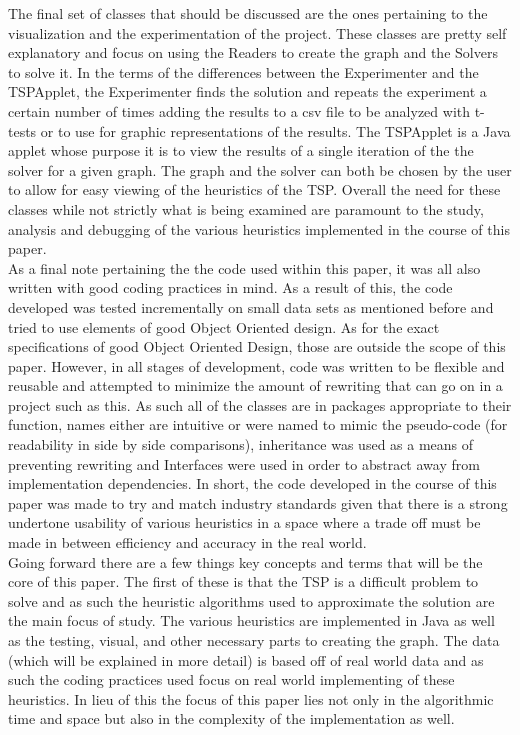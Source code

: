 \documentclass[midd]{thesis}
\newcommand{\tab}{\hspace*{2em}}
\begin{document}
\tab The final set of classes that should be discussed are the ones pertaining to the visualization and the experimentation of the project. These classes are pretty self explanatory and focus on using the Readers to create the graph and the Solvers to solve it. In the terms of the differences between the Experimenter and the TSPApplet, the Experimenter finds the solution and repeats the experiment a certain number of times adding the results to a csv file to be analyzed with t-tests or to use for graphic representations of the results. The TSPApplet is a Java applet whose purpose it is to view the results of a single iteration of the the solver for a given graph. The graph and the solver can both be chosen by the user to allow for easy viewing of the heuristics of the TSP. Overall the need for these classes while not strictly what is being examined are paramount to the study, analysis and debugging of the various heuristics implemented in the course of this paper.\\
\tab As a final note pertaining the the code used within this paper, it was all also written with good coding practices in mind. As a result of this, the code developed was tested incrementally on small data sets as mentioned before and tried to use elements of good Object Oriented design. As for the exact specifications of good Object Oriented Design, those are outside the scope of this paper. However, in all stages of development, code was written to be flexible and reusable and attempted to minimize the amount of rewriting that can go on in a project such as this. As such all of the classes are in packages appropriate to their function, names either are intuitive or were named to mimic the pseudo-code (for readability in side by side comparisons), inheritance was used as a means of preventing rewriting and Interfaces were used in order to abstract away from implementation dependencies. In short, the code developed in the course of this paper was made to try and match industry standards given that there is a strong undertone usability of various heuristics in a space where a trade off must be made in between efficiency and accuracy in the real world.\\
\tab Going forward there are a few things key concepts and terms that will be the core of this paper. The first of these is that the TSP is a difficult problem to solve and as such the heuristic algorithms used to approximate the solution are the main focus of study. The various heuristics are implemented in Java as well as the testing, visual, and other necessary parts to creating the graph. The data (which will be explained in more detail) is based off of real world data and as such the coding practices used focus on real world implementing of these heuristics. In lieu of this the focus of this paper lies not only in the algorithmic time and space but also in the complexity of the implementation as well.
\end{document}
